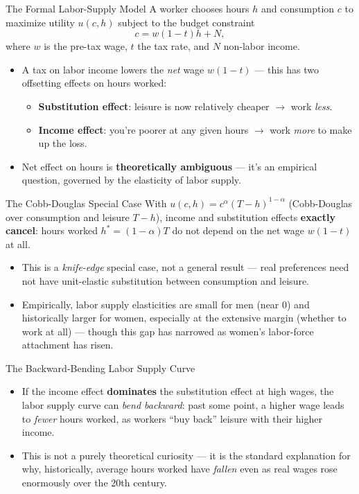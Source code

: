 \documentclass[11pt,aspectratio=169]{beamer}
\begin{document}
\begin{frame}{The Formal Labor-Supply Model}
  \footnotesize
  A worker chooses hours $h$ and consumption $c$ to maximize utility $u(c, h)$ subject to the budget constraint
  \[
    c = w(1-t)h + N,
  \]
  where $w$ is the pre-tax wage, $t$ the tax rate, and $N$ non-labor income.
  \vspace{0.3em}
  \begin{itemize}
    \item A tax on labor income lowers the \emph{net} wage $w(1-t)$ --- this has two offsetting effects on hours worked:
    \begin{itemize}
      \item \textbf{Substitution effect}: leisure is now relatively cheaper $\rightarrow$ work \emph{less}.
      \item \textbf{Income effect}: you're poorer at any given hours $\rightarrow$ work \emph{more} to make up the loss.
    \end{itemize}
    \item Net effect on hours is \textbf{theoretically ambiguous} --- it's an empirical question, governed by the elasticity of labor supply.
  \end{itemize}
\end{frame}

\begin{frame}{The Cobb-Douglas Special Case}
  \small
  With $u(c,h) = c^{\alpha}(T-h)^{1-\alpha}$ (Cobb-Douglas over consumption and leisure $T-h$), income and substitution effects \textbf{exactly cancel}: hours worked $h^* = (1-\alpha)T$ do not depend on the net wage $w(1-t)$ at all.
  \vspace{0.3em}
  \begin{itemize}
    \item This is a \emph{knife-edge} special case, not a general result --- real preferences need not have unit-elastic substitution between consumption and leisure.
    \item Empirically, labor supply elasticities are small for men (near 0) and historically larger for women, especially at the extensive margin (whether to work at all) --- though this gap has narrowed as women's labor-force attachment has risen.
  \end{itemize}
\end{frame}

\begin{frame}{The Backward-Bending Labor Supply Curve}
  \small
  \begin{itemize}
    \item If the income effect \textbf{dominates} the substitution effect at high wages, the labor supply curve can \emph{bend backward}: past some point, a higher wage leads to \emph{fewer} hours worked, as workers ``buy back'' leisure with their higher income.
    \item This is not a purely theoretical curiosity --- it is the standard explanation for why, historically, average hours worked have \emph{fallen} even as real wages rose enormously over the 20th century.
  \end{itemize}
\end{frame}
\end{document}
